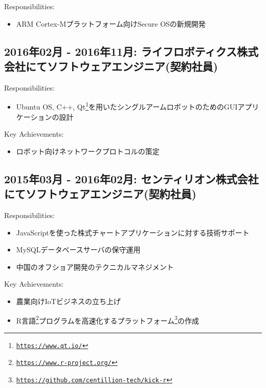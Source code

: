 \documentclass[letterpaper]{article}
\begin{document}
\noindent Responsibilities:

\begin{itemize}
  \item ARM Cortex-Mプラットフォーム向けSecure OSの新規開発
\end{itemize}

\subsection*{2016年02月 - 2016年11月: ライフロボティクス株式会社にてソフトウェアエンジニア(契約社員)}

\noindent Responsibilities:

\begin{itemize}
  \item Ubuntu OS, C++, Qt\footnote{\href{https://www.qt.io/}{\tt https://www.qt.io/}}を用いたシングルアームロボットのためのGUIアプリケーションの設計
\end{itemize}

\noindent Key Achievements:

\begin{itemize}
  \item ロボット向けネットワークプロトコルの策定
\end{itemize}

\subsection*{2015年03月 - 2016年02月: センティリオン株式会社にてソフトウェアエンジニア(契約社員)}

\noindent Responsibilities:

\begin{itemize}
  \item JavaScriptを使った株式チャートアプリケーションに対する技術サポート
  \item MySQLデータベースサーバの保守運用
  \item 中国のオフショア開発のテクニカルマネジメント
\end{itemize}

\noindent Key Achievements:

\begin{itemize}
  \item 農業向けIoTビジネスの立ち上げ
  \item R言語\footnote{\href{https://www.r-project.org/}{\tt https://www.r-project.org/}}プログラムを高速化するプラットフォーム\footnote{\href{https://github.com/centillion-tech/kick-r}{\tt https://github.com/centillion-tech/kick-r}}の作成
\end{itemize}
\end{document}
